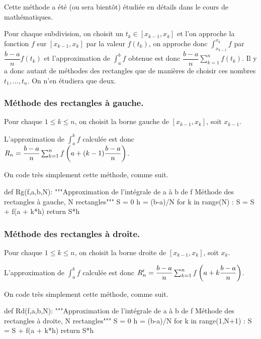Cette méthode a été (ou sera bientôt) étudiée en détails dans le cours de mathématiques. 

Pour chaque subdivision, on choisit un $t_k\in[x_{k-1},x_{k}]$ et l'on approche la fonction $f$ sur $[x_{k-1},x_{k}]$ par la valeur $f(t_k)$, on approche donc $\displaystyle\int_{x_{k-1}}^{x_{k}} f$ par $\dfrac{b-a}{n} f(t_k)$ et l'approximation de  $\displaystyle\int_a^b f$ obtenue est donc $ \dfrac{b-a}{n} \sum_{k=1}^n f(t_k)$.
Il y a donc autant de méthodes des rectangles que de manières de choisir ces nombres $t_1,\dots,t_n$. On n'en étudiera que deux. 



\subsubsection{Méthode des rectangles à gauche.}

Pour chaque $1 \leq k \leq n$, on choisit la borne gauche de $[x_{k-1},x_{k}]$, soit $x_{k-1}$.

L'approximation de  $\displaystyle\int_a^b f$ calculée est donc $  R_n = \dfrac{b-a}{n} \sum_{k=1}^n f\left( a+(k-1)\dfrac{b-a}{n}\right)$.

On code très simplement cette méthode, comme suit. 

\begin{pyverbatim}
def Rg(f,a,b,N):
    """Approximation de l'intégrale de a à b de f 
    Méthode des rectangles à gauche, N rectangles"""
    S = 0
    h = (b-a)/N
    for k in range(N) : 
        S = S + f(a + k*h)
    return S*h
\end{pyverbatim}

\subsubsection{Méthode des rectangles à droite.}

Pour chaque $1 \leq k \leq n$, on choisit la borne droite de $[x_{k-1},x_{k}]$, soit $x_k$.

L'approximation de  $\displaystyle\int_a^b f$ calculée est donc $
  R_n' = \dfrac{b-a}{n} \sum_{k=1}^n f\left( a+k\dfrac{b-a}{n}\right)$.


On code très simplement cette méthode, comme suit. 

\begin{pyverbatim}
def Rd(f,a,b,N):
    """Approximation de l'intégrale de a à b de f 
    Méthode des rectangles à droite, N rectangles"""
    S = 0
    h = (b-a)/N
    for k in range(1,N+1) : 
        S = S + f(a + k*h)
    return S*h
\end{pyverbatim}

